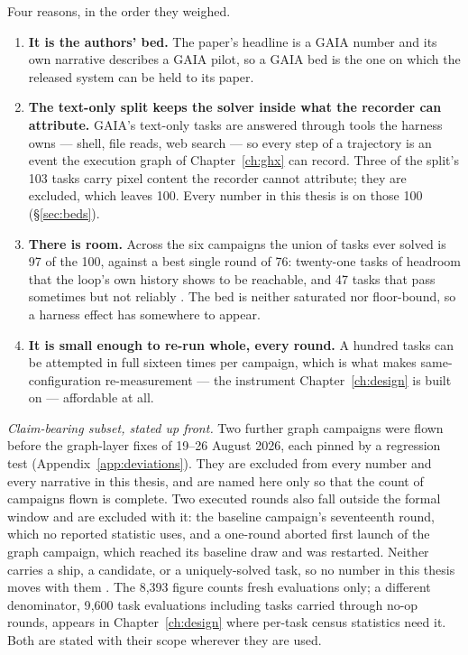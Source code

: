 Four reasons, in the order they weighed.

\begin{enumerate}
  \item \textbf{It is the authors' bed.} The paper's headline is a GAIA
        number and its own narrative describes a GAIA pilot, so a GAIA bed
        is the one on which the released system can be held to its
        paper.
  \item \textbf{The text-only split keeps the solver inside what the
        recorder can attribute.} GAIA's text-only tasks are answered
        through tools the harness owns --- shell, file reads, web search
        --- so every step of a trajectory is an event the execution graph
        of Chapter~\ref{ch:ghx} can record. Three of the split's 103 tasks
        carry pixel content the recorder cannot attribute; they are
        excluded, which leaves 100. Every number in this thesis is on
        those 100 (\S\ref{sec:beds}).
  \item \textbf{There is room.} Across the six campaigns the union of
        tasks ever solved is 97 of the 100, against a best single round of
        76: twenty-one tasks of headroom that the loop's own history shows
        to be reachable, and 47 tasks that pass sometimes but not
        reliably . The bed is neither saturated nor floor-bound, so a
        harness effect has somewhere to appear.
  \item \textbf{It is small enough to re-run whole, every round.} A
        hundred tasks can be attempted in full sixteen times per campaign,
        which is what makes same-configuration re-measurement --- the
        instrument Chapter~\ref{ch:design} is built on --- affordable at
        all.
\end{enumerate}

\emph{Claim-bearing subset, stated up front.} Two further graph campaigns
were flown before the graph-layer fixes of 19--26 August 2026, each
pinned by a regression test (Appendix~\ref{app:deviations}). They are
excluded from every number and every narrative in this thesis, and are
named here only so that the count of campaigns flown is complete. Two executed rounds
also fall outside the formal window and are excluded with it: the baseline campaign's seventeenth
round, which no reported statistic uses, and a one-round aborted first
launch of the graph campaign,
which reached its baseline draw and was restarted. Neither carries a ship,
a candidate, or a uniquely-solved task, so no number in this thesis moves
with them . The 8{,}393 figure counts fresh
evaluations only; a different denominator, 9{,}600 task evaluations
including tasks carried through no-op rounds, appears in
Chapter~\ref{ch:design} where per-task census statistics need it. Both are
stated with their scope wherever they are used.

